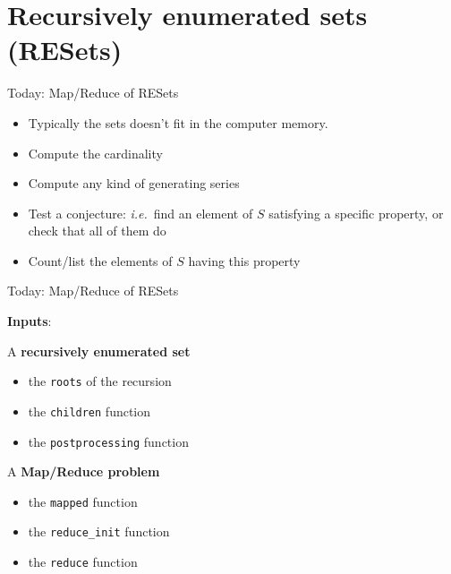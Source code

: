 \documentclass[compress,11pt]{beamer}
\begin{document}
\section{Recursively enumerated sets (RESets)}
\begin{frame}[fragile]{Today: Map/Reduce of RESets}

  \begin{center}
  \end{center}
  \bigskip\pause

  \begin{itemize}
  \item Typically the sets doesn't fit in the computer memory.
    \bigskip

  \item Compute the cardinality
  \item Compute any kind of generating series
  \item Test a conjecture: \textit{i.e.}\ find an element of $S$ satisfying a
    specific property, or check that all of them do
  \item Count/list the elements of $S$ having this property
  \end{itemize}
\end{frame}

\begin{frame}[fragile]{Today: Map/Reduce of RESets}

  \textbf{Inputs}:
  \bigskip

  A \textbf{recursively enumerated set}
  \begin{itemize}
  \item the \texttt{roots} of the recursion
  \item the \texttt{children} function
  \item the \texttt{postprocessing} function
  \end{itemize}
  A \textbf{Map/Reduce problem}
  \begin{itemize}
  \item the \texttt{mapped} function
  \item the \verb|reduce_init| function
  \item the \texttt{reduce} function
  \end{itemize}
\end{frame}
\end{document}
